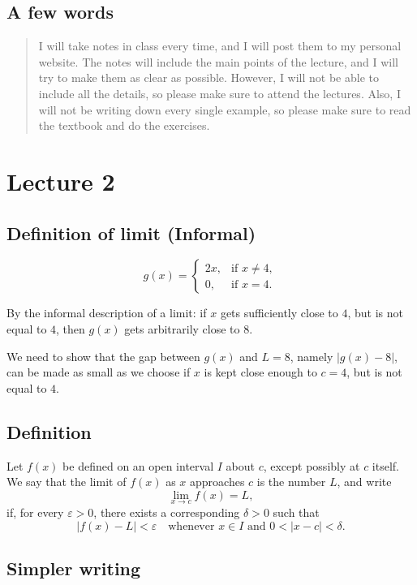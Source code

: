 \documentclass[12pt]{article}
\begin{document}
\subsection*{A few words}

\begin{quote}
	I will take notes in class every time, and I will post them to my personal website. The notes will include the main points of the lecture, and I will try to make them as clear as possible. However, I will not be able to include all the details, so please make sure to attend the lectures. Also, I will not be writing down every single example, so please make sure to read the textbook and do the exercises.
\end{quote}

\section*{Lecture 2}

\subsection*{Definition of limit (Informal)}
\[
g(x)=
\begin{cases}
2x, & \text{if } x\ne4,\\
0, & \text{if } x=4.
\end{cases}
\]

By the informal description of a limit: if $x$ gets sufficiently close to $4$, but is not equal to $4$, then $g(x)$ gets arbitrarily close to $8$.

We need to show that the gap between $g(x)$ and $L=8$, namely $|g(x)-8|$, can be made as small as we choose if $x$ is kept close enough to $c=4$, but is not equal to $4$.

\subsection*{Definition}

Let $f(x)$ be defined on an open interval $I$ about $c$, except possibly at $c$ itself. We say that the limit of $f(x)$ as $x$ approaches $c$ is the number $L$, and write
\[
\lim_{x\to c}f(x)=L,
\]
if, for every $\varepsilon>0$, there exists a corresponding $\delta>0$ such that
\[
|f(x)-L|<\varepsilon
\quad\text{whenever }x\in I\text{ and }0<|x-c|<\delta.
\]

\subsection*{Simpler writing}
\end{document}
